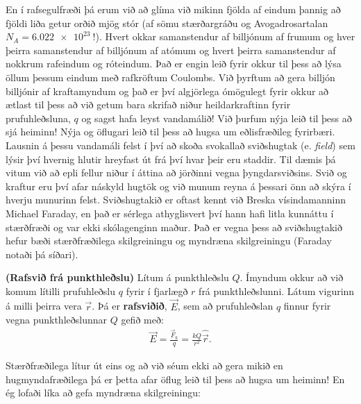 \ifdefined \wholebook \else\documentclass[oneside]{book}\usepackage{EdlBook}\graphicspath{{figures/}}
\begin{document}
En í rafsegulfræði þá erum við að glíma við mikinn fjölda af eindum þannig að fjöldi liða getur orðið mjög stór (af sömu stærðargráðu og Avogadrosartalan $N_A = \SI{6.022e23}{}$!). Hvert okkar samanstendur af billjónum af frumum og hver þeirra samanstendur af billjónum af atómum og hvert þeirra samanstendur af nokkrum rafeindum og róteindum. Það er engin leið fyrir okkur til þess að lýsa öllum þessum eindum með rafkröftum Coulombs. Við þyrftum að gera billjón billjónir af kraftamyndum og það er því algjörlega ómögulegt fyrir okkur að ætlast til þess að við getum bara skrifað niður heildarkraftinn fyrir prufuhleðsluna, $q$ og sagst hafa leyst vandamálið! Við þurfum nýja leið til þess að sjá heiminn! Nýja og öflugari leið til þess að hugsa um eðlisfræðileg fyrirbæri. Lausnin á þessu vandamáli felst í því að skoða svokallað sviðshugtak (e. \emph{field}) sem lýsir því hvernig hlutir hreyfast út frá því hvar þeir eru staddir. Til dæmis þá vitum við að epli fellur niður í áttina að jörðinni vegna þyngdarsviðsins. Svið og kraftur eru því afar náskyld hugtök og við munum reyna á þessari önn að skýra í hverju munurinn felst. Sviðshugtakið er oftast kennt við Breska vísindamanninn Michael Faraday, en það er sérlega athyglisvert því hann hafi litla kunnáttu í stærðfræði og var ekki skólagenginn maður. Það er vegna þess að sviðshugtakið hefur bæði stærðfræðilega skilgreiningu og myndræna skilgreiningu (Faraday notaði þá síðari).

\begin{tcolorbox}
\begin{definition}
\textbf{(Rafsvið frá punkthleðslu)} Lítum á punkthleðslu $Q$. Ímyndum okkur að við komum lítilli prufuhleðslu $q$ fyrir í fjarlægð $r$ frá punkthleðslunni. Látum vigurinn á milli þeirra vera $\Vec{r}$. Þá er \textbf{rafsviðið}, $\vec{E}$, sem að prufuhleðslan $q$ finnur fyrir vegna punkthleðslunnar $Q$ gefið með:
\begin{align*}
    \Vec{E} = \frac{\vec{F}_k}{q}= \frac{kQ}{r^2} \hat{\vec{r}}.
\end{align*}
\end{definition}
\end{tcolorbox}

Stærðfræðilega lítur út eins og að við séum ekki að gera mikið en hugmyndafræðilega þá er þetta afar öflug leið til þess að hugsa um heiminn! En ég lofaði líka að gefa myndræna skilgreiningu:
\end{document}
